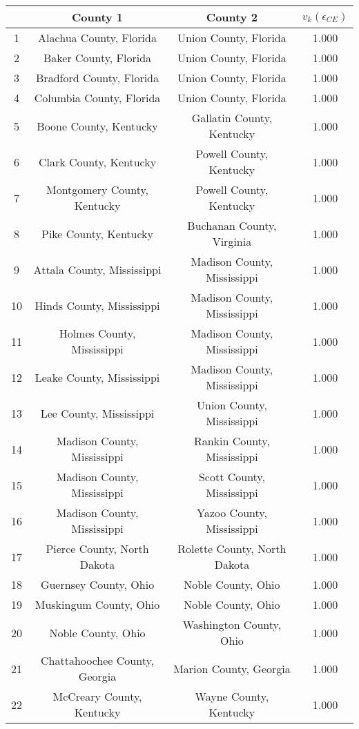\begin{longtable}{cccc}
  \hline
 & County 1 & County 2 & $v_k(\epsilon_{CE})$ \\ 
  \hline
1 & Alachua County, Florida & Union County, Florida & 1.000 \\ 
  2 & Baker County, Florida & Union County, Florida & 1.000 \\ 
  3 & Bradford County, Florida & Union County, Florida & 1.000 \\ 
  4 & Columbia County, Florida & Union County, Florida & 1.000 \\ 
  5 & Boone County, Kentucky & Gallatin County, Kentucky & 1.000 \\ 
  6 & Clark County, Kentucky & Powell County, Kentucky & 1.000 \\ 
  7 & Montgomery County, Kentucky & Powell County, Kentucky & 1.000 \\ 
  8 & Pike County, Kentucky & Buchanan County, Virginia & 1.000 \\ 
  9 & Attala County, Mississippi & Madison County, Mississippi & 1.000 \\ 
  10 & Hinds County, Mississippi & Madison County, Mississippi & 1.000 \\ 
  11 & Holmes County, Mississippi & Madison County, Mississippi & 1.000 \\ 
  12 & Leake County, Mississippi & Madison County, Mississippi & 1.000 \\ 
  13 & Lee County, Mississippi & Union County, Mississippi & 1.000 \\ 
  14 & Madison County, Mississippi & Rankin County, Mississippi & 1.000 \\ 
  15 & Madison County, Mississippi & Scott County, Mississippi & 1.000 \\ 
  16 & Madison County, Mississippi & Yazoo County, Mississippi & 1.000 \\ 
  17 & Pierce County, North Dakota & Rolette County, North Dakota & 1.000 \\ 
  18 & Guernsey County, Ohio & Noble County, Ohio & 1.000 \\ 
  19 & Muskingum County, Ohio & Noble County, Ohio & 1.000 \\ 
  20 & Noble County, Ohio & Washington County, Ohio & 1.000 \\ 
  21 & Chattahoochee County, Georgia & Marion County, Georgia & 1.000 \\ 
  22 & McCreary County, Kentucky & Wayne County, Kentucky & 1.000 \\ 

\end{longtable}
